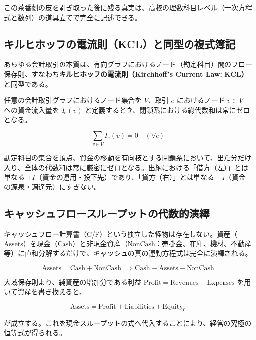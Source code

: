\documentclass[11pt, a4paper]{report}
\begin{document}
この茶番劇の皮を剥ぎ取った後に残る真実は、高校の理数科目レベル（一次方程式と数列）の道具立てで完全に記述できる。

\subsection{キルヒホッフの電流則（KCL）と同型の複式簿記}

あらゆる会計取引の本質は、有向グラフにおけるノード（勘定科目）間のフロー保存則、すなわち\textbf{キルヒホッフの電流則（Kirchhoff's Current Law: KCL）}と同型である。

任意の会計取引グラフにおけるノード集合を $V$、取引 $e$ におけるノード $v \in V$ への資金流入量を $I_e(v)$ と定義するとき、閉鎖系における総代数和は常にゼロとなる。

\begin{equation}
    \sum_{v \in V} I_e(v) = 0 \quad (\forall e)
\end{equation}

勘定科目の集合を頂点、資金の移動を有向枝とする閉鎖系において、出た分だけ入り、全体の代数和は常に厳密にゼロとなる。出納における「借方（左）」とは単なる $+I$（資金の運用・投下先）であり、「貸方（右）」とは単なる $-I$（資金の源泉・調達元）にすぎない。

\subsection{キャッシュフロースループットの代数的演繹}

キャッシュフロー計算書（C/F）という独立した怪物は存在しない。資産（$\text{Assets}$）を現金（$\text{Cash}$）と非現金資産（$\text{NonCash}$：売掛金、在庫、機材、不動産等）に直和分解するだけで、キャッシュの真の運動方程式は完全に演繹される。

\begin{equation}
    \text{Assets} = \text{Cash} + \text{NonCash} \implies \text{Cash} \equiv \text{Assets} - \text{NonCash}
\end{equation}

大域保存則より、純資産の増加分である利益 $\text{Profit} = \text{Revenues} - \text{Expenses}$ を用いて資産を書き換えると、

\begin{equation}
    \text{Assets} = \text{Profit} + \text{Liabilities} + \text{Equity}_0
\end{equation}

が成立する。これを現金スループットの式へ代入することにより、経営の究極の恒等式が得られる。
\end{document}

